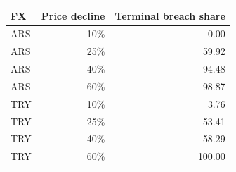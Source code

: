 \begin{tabular}{lrr}
\toprule
FX & Price decline & Terminal breach share \\
\midrule
ARS & 10\% & 0.00 \\
ARS & 25\% & 59.92 \\
ARS & 40\% & 94.48 \\
ARS & 60\% & 98.87 \\
TRY & 10\% & 3.76 \\
TRY & 25\% & 53.41 \\
TRY & 40\% & 58.29 \\
TRY & 60\% & 100.00 \\
\bottomrule
\end{tabular}
